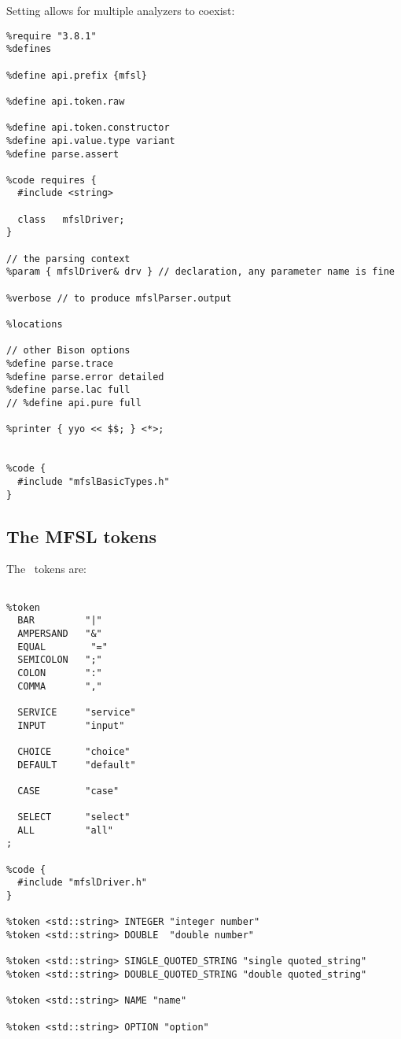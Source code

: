 Setting  allows for multiple analyzers to coexist:
\begin{lstlisting}[language=Bison]
%skeleton "lalr1.cc" // -*- C++ -*-
%require "3.8.1"
%defines

%define api.prefix {mfsl}

%define api.token.raw

%define api.token.constructor
%define api.value.type variant
%define parse.assert

%code requires {
  #include <string>

  class   mfslDriver;
}

// the parsing context
%param { mfslDriver& drv } // declaration, any parameter name is fine

%verbose // to produce mfslParser.output

%locations

// other Bison options
%define parse.trace
%define parse.error detailed
%define parse.lac full
// %define api.pure full

%printer { yyo << $$; } <*>;


%code {
  #include "mfslBasicTypes.h"
}
\end{lstlisting}


\subsection{The MFSL tokens}

The \mfslLang\ tokens are:
\begin{lstlisting}[language=Bison]
%define api.token.prefix {MFSL_TOK_}

%token
  BAR         "|"
  AMPERSAND   "&"
  EQUAL        "="
  SEMICOLON   ";"
  COLON       ":"
  COMMA       ","

  SERVICE     "service"
  INPUT       "input"

  CHOICE      "choice"
  DEFAULT     "default"

  CASE        "case"

  SELECT      "select"
  ALL         "all"
;

%code {
  #include "mfslDriver.h"
}

%token <std::string> INTEGER "integer number"
%token <std::string> DOUBLE  "double number"

%token <std::string> SINGLE_QUOTED_STRING "single quoted_string"
%token <std::string> DOUBLE_QUOTED_STRING "double quoted_string"

%token <std::string> NAME "name"

%token <std::string> OPTION "option"
\end{lstlisting}


